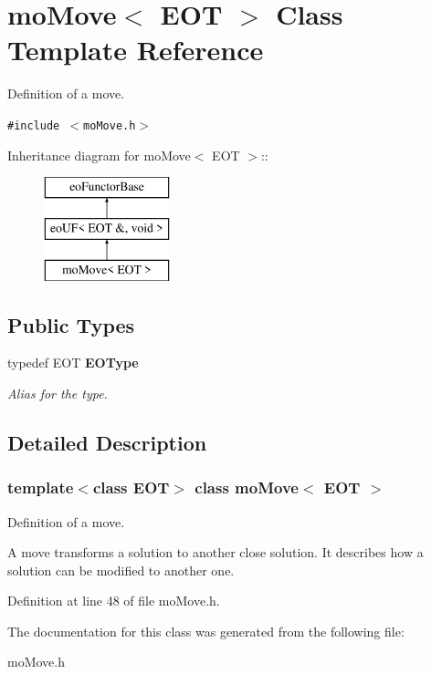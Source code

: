 \section{moMove$<$ EOT $>$ Class Template Reference}
\label{classmo_move}
Definition of a move.  


{\tt \#include $<$moMove.h$>$}

Inheritance diagram for moMove$<$ EOT $>$::\begin{figure}[H]
\begin{center}
\leavevmode
\includegraphics[height=3cm]{classmo_move}
\end{center}
\end{figure}
\subsection*{Public Types}
\begin{CompactItemize}
\item 
typedef EOT {\bf EOType}\label{classmo_move_7fb853a91ba1319530529e515380bbba}

\begin{CompactList}\small\item\em Alias for the type. \item\end{CompactList}\end{CompactItemize}


\subsection{Detailed Description}
\subsubsection*{template$<$class EOT$>$ class moMove$<$ EOT $>$}

Definition of a move. 

A move transforms a solution to another close solution. It describes how a solution can be modified to another one. 



Definition at line 48 of file moMove.h.

The documentation for this class was generated from the following file:\begin{CompactItemize}
\item 
moMove.h\end{CompactItemize}
